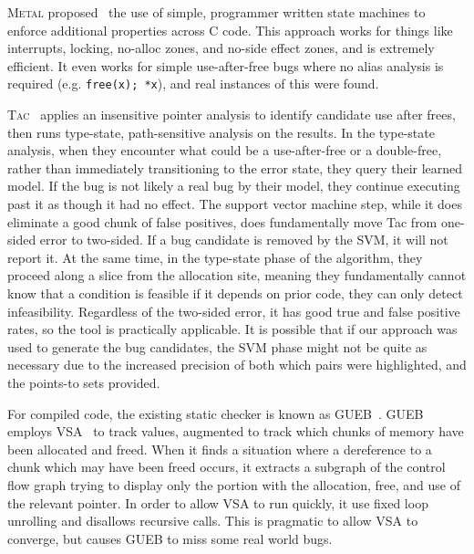 \textsc{Metal} proposed~\cite{metal} the use of simple, programmer written state machines to enforce additional properties across C code.
This approach works for things like interrupts, locking, no-alloc zones, and no-side effect zones, and is extremely efficient.
It even works for simple use-after-free bugs where no alias analysis is required (e.g. \texttt{free(x); *x}), and real instances of this were found.

\textsc{Tac}~\cite{tac} applies an insensitive pointer analysis to identify candidate use after frees, then runs type-state, path-sensitive analysis on the results.
In the type-state analysis, when they encounter what could be a use-after-free or a double-free, rather than immediately transitioning to the error state, they query their learned model.
If the bug is not likely a real bug by their model, they continue executing past it as though it had no effect.
The support vector machine step, while it does eliminate a good chunk of false positives, does fundamentally move Tac from one-sided error to two-sided.
If a bug candidate is removed by the SVM, it will not report it.
At the same time, in the type-state phase of the algorithm, they proceed along a slice from the allocation site, meaning they fundamentally cannot know that a condition is feasible if it depends on prior code, they can only detect infeasibility.
Regardless of the two-sided error, it has good true and false positive rates, so the tool is practically applicable.
It is possible that if our approach was used to generate the bug candidates, the SVM phase might not be quite as necessary due to the increased precision of both which pairs were highlighted, and the points-to sets provided.

For compiled code, the existing static checker is known as GUEB~\cite{gueb}.
GUEB employs VSA~\cite{vsa} to track values, augmented to track which chunks of memory have been allocated and freed.
When it finds a situation where a dereference to a chunk which may have been freed occurs, it extracts a subgraph of the control flow graph trying to display only the portion with the allocation, free, and use of the relevant pointer.
In order to allow VSA to run quickly, it use fixed loop unrolling and disallows recursive calls.
This is pragmatic to allow VSA to converge, but causes GUEB to miss some real world bugs.

